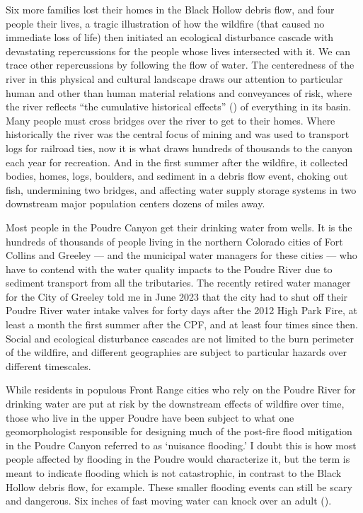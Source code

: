 \documentclass[
]{article}
\begin{document}
Six more families lost their homes in the Black Hollow debris flow, and four people their lives, a tragic illustration of how the wildfire (that caused no immediate loss of life) then initiated an ecological disturbance cascade with devastating repercussions for the people whose lives intersected with it. We can trace other repercussions by following the flow of water. The centeredness of the river in this physical and cultural landscape draws our attention to particular human and other than human material relations and conveyances of risk, where the river reflects ``the cumulative historical effects'' () of everything in its basin. Many people must cross bridges over the river to get to their homes. Where historically the river was the central focus of mining and was used to transport logs for railroad ties, now it is what draws hundreds of thousands to the canyon each year for recreation. And in the first summer after the wildfire, it collected bodies, homes, logs, boulders, and sediment in a debris flow event, choking out fish, undermining two bridges, and affecting water supply storage systems in two downstream major population centers dozens of miles away.

Most people in the Poudre Canyon get their drinking water from wells. It is the hundreds of thousands of people living in the northern Colorado cities of Fort Collins and Greeley --- and the municipal water managers for these cities --- who have to contend with the water quality impacts to the Poudre River due to sediment transport from all the tributaries. The recently retired water manager for the City of Greeley told me in June 2023 that the city had to shut off their Poudre River water intake valves for forty days after the 2012 High Park Fire, at least a month the first summer after the CPF, and at least four times since then. Social and ecological disturbance cascades are not limited to the burn perimeter of the wildfire, and different geographies are subject to particular hazards over different timescales.

While residents in populous Front Range cities who rely on the Poudre River for drinking water are put at risk by the downstream effects of wildfire over time, those who live in the upper Poudre have been subject to what one geomorphologist responsible for designing much of the post-fire flood mitigation in the Poudre Canyon referred to as `nuisance flooding.' I doubt this is how most people affected by flooding in the Poudre would characterize it, but the term is meant to indicate flooding which is not catastrophic, in contrast to the Black Hollow debris flow, for example. These smaller flooding events can still be scary and dangerous. Six inches of fast moving water can knock over an adult ().
\end{document}
